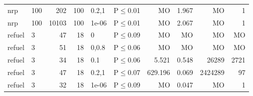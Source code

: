 \begin{longtable}{llrrllrrrr}
 nrp           & 100      &    	202 & 100 & 0.2,1 & P$\leq$0.01  & MO      & 1.967   & MO      & 1      \\
 nrp           & 100      &  	10103 & 100 & 1e-06 & P$\leq$0.01  & MO      & 2.067   & MO      & 1      \\
 refuel        & 3        &     	47 &  18 & 0     & P$\leq$0.09  & MO      & MO      & MO      & MO     \\
 refuel        & 3        &     	51 &  18 & 0,0.8 & P$\leq$0.06  & MO      & MO      & MO      & MO     \\
 refuel        & 3        &     	34 &  18 & 0.1   & P$\leq$0.06  & 5.521   & 0.548   & 26289   & 2721   \\
 refuel        & 3        &     	47 &  18 & 0.2,1 & P$\leq$0.07  & 629.196 & 0.069   & 2424289 & 97     \\
 refuel        & 3        &     	32 &  18 & 1e-06 & P$\leq$0.09  & MO      & 0.047   & MO      & 1      \\
\bottomrule
\end{longtable}
